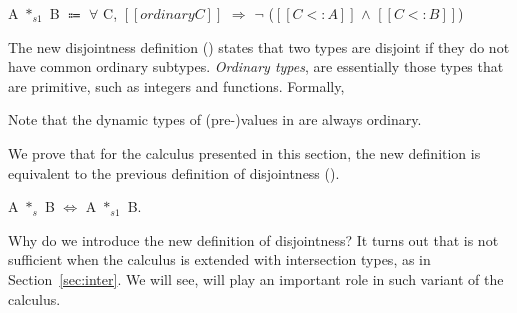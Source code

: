 \begin{definition}
    A $*_{s1}$ B $\Coloneqq$ $\forall$ C, $[[ordinary C]]$ $\Longrightarrow$ $\neg$ ($[[C <: A]]$ $\wedge$ $[[C <: B]]$)
    \label{def:union:disj1}
  \end{definition}

\noindent
The new disjointness definition () states that two
types are disjoint if they do not have common ordinary subtypes.
\emph{Ordinary types}, are essentially
those types that are primitive, such as integers and functions. Formally,

\medskip

\noindent Note that the dynamic types of (pre-)values in \name are always ordinary.

We prove that for the calculus presented in this section, the new definition is
equivalent to the previous definition of disjointness
().

\begin{lemma}
A $*_{s}$ B $\Longleftrightarrow$ A $*_{s1}$ B.
\end{lemma}

Why do we introduce the new definition of disjointness? It turns out that
 is not sufficient when the calculus is extended with
intersection types, as in Section~\ref{sec:inter}. We will see,
 will play an important role in such variant of the calculus.


